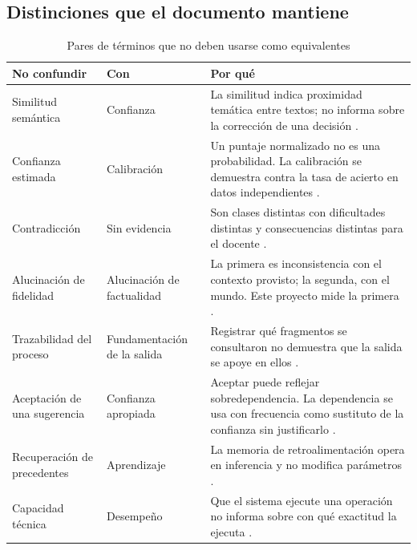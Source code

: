 \subsection{Distinciones que el documento mantiene}
\label{sec:conc-distinciones}

\begin{table}[H]
\centering
\small
\caption{Pares de términos que no deben usarse como equivalentes}
\label{tab:distinciones}
\begin{tabularx}{\textwidth}{@{}L{3.4cm} L{3.4cm} X@{}}
\toprule
\textbf{No confundir} & \textbf{Con} & \textbf{Por qué} \\
\midrule
Similitud semántica & Confianza &
La similitud indica proximidad temática entre textos; no informa sobre la corrección
de una decisión \parencite{reimers2019sentencebert}. \\
Confianza estimada & Calibración &
Un puntaje normalizado no es una probabilidad. La calibración se demuestra contra la
tasa de acierto en datos independientes \parencite{guo2017calibration}. \\
Contradicción & Sin evidencia &
Son clases distintas con dificultades distintas y consecuencias distintas para el
docente \parencite{thorne2018fever,gubelmann2024capturing}. \\
Alucinación de fidelidad & Alucinación de factualidad &
La primera es inconsistencia con el contexto provisto; la segunda, con el mundo. Este
proyecto mide la primera \parencite{huang2025survey}. \\
Trazabilidad del proceso & Fundamentación de la salida &
Registrar qué fragmentos se consultaron no demuestra que la salida se apoye en ellos
\parencite{moreau2013provdm}. \\
Aceptación de una sugerencia & Confianza apropiada &
Aceptar puede reflejar sobredependencia. La dependencia se usa con frecuencia como
sustituto de la confianza sin justificarlo \parencite{mehrotra2024systematic}. \\
Recuperación de precedentes & Aprendizaje &
La memoria de retroalimentación opera en inferencia y no modifica parámetros
\parencite{fernandes2023bridging}. \\
Capacidad técnica & Desempeño &
Que el sistema ejecute una operación no informa sobre con qué exactitud la ejecuta
\parencite{hevner2004design}. \\
\bottomrule
\end{tabularx}
\end{table}
